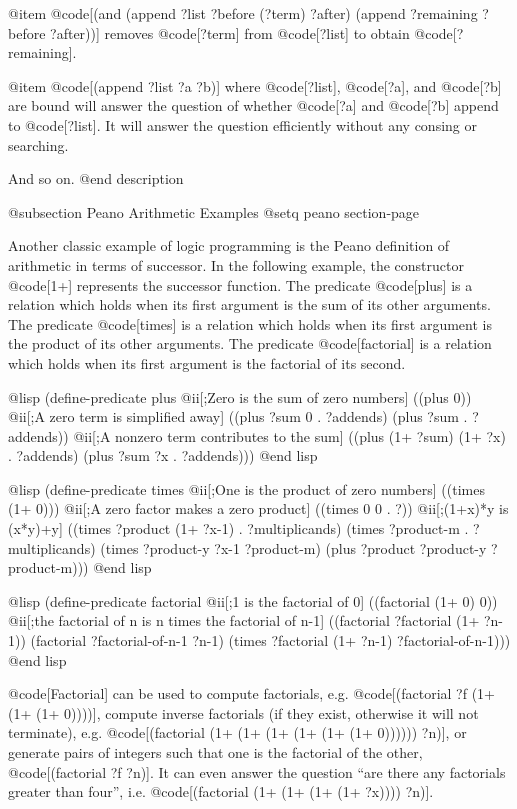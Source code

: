 {@item @code[(and (append ?list ?before (?term) ?after) (append ?remaining ?before ?after))]
removes @code[?term] from @code[?list] to obtain @code[?remaining].

@item @code[(append ?list ?a ?b)]
where @code[?list], @code[?a], and @code[?b] are
bound will answer the question of whether @code[?a] and @code[?b] append to 
@code[?list].
It will answer the question efficiently without any consing or searching.

And so on.
@end description

@subsection Peano Arithmetic Examples
@setq peano section-page

Another classic example of logic programming is the Peano definition of
arithmetic in terms of successor.
In the following example, the constructor @code[1+] represents the successor
function.
The predicate @code[plus] is a relation which holds when its first argument is
the sum of its other arguments.
The predicate @code[times] is a relation which holds when its first argument is
the product of its other arguments.
The predicate @code[factorial] is a relation which holds when its 
first argument is the factorial of its second.

@lisp
(define-predicate plus
  @ii[;Zero is the sum of zero numbers]
  ((plus 0)) 
  @ii[;A zero term is simplified away]
  ((plus ?sum 0 . ?addends) 
   (plus ?sum . ?addends)) 
  @ii[;A nonzero term contributes to the sum]
  ((plus (1+ ?sum) (1+ ?x) . ?addends)
   (plus ?sum ?x . ?addends)))
@end lisp

@lisp
(define-predicate times
  @ii[;One is the product of zero numbers]
  ((times (1+ 0))) 
  @ii[;A zero factor makes a zero product]
  ((times 0 0 . ?)) 
  @ii[;(1+x)*y is (x*y)+y]
  ((times ?product (1+ ?x-1) . ?multiplicands) 
   (times ?product-m . ?multiplicands)
   (times ?product-y ?x-1 ?product-m)
   (plus ?product ?product-y ?product-m)))
@end lisp

@lisp
(define-predicate factorial
  @ii[;1 is the factorial of 0]
  ((factorial (1+ 0) 0)) 
  @ii[;the factorial of n is n times the factorial of n-1]
  ((factorial ?factorial (1+ ?n-1))    
   (factorial ?factorial-of-n-1 ?n-1) 
   (times ?factorial (1+ ?n-1) ?factorial-of-n-1)))
@end lisp

@code[Factorial] can be used to compute factorials, e.g. 
@code[(factorial ?f (1+ (1+ (1+ 0))))], compute inverse factorials
(if they exist, otherwise it will not terminate), e.g.
@code[(factorial (1+ (1+ (1+ (1+ (1+ (1+ 0)))))) ?n)],
or generate pairs of integers
such that one is the factorial of the other, @code[(factorial ?f ?n)]. 
It can even answer the question ``are there any factorials greater than four'',
i.e. @code[(factorial (1+ (1+ (1+ (1+ ?x)))) ?n)].

}
